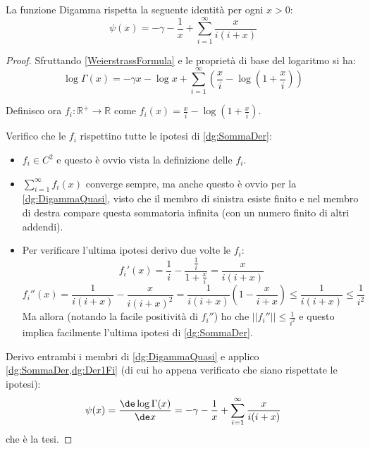 \begin{theorem}\label{dg:DigammaId}
	La funzione Digamma rispetta la seguente identità per ogni $x>0$:
	\begin{equation*}
		\psi(x)=-\gamma-\frac 1x +\sum_{i=1}^{\infty} \frac x{i(i+x)}
	\end{equation*}
\end{theorem}
\begin{proof}
	Sfruttando \cref{WeierstrassFormula} e le proprietà di base del logaritmo si ha:
	\begin{equation}\label{dg:DigammaQuasi}
		\log\Gamma(x)=-\gamma x- \log{x} +\sum_{i=1}^{\infty}\left(\frac xi -\log\left(1+\frac xi\right)\right)
	\end{equation}
	
	Definisco ora $f_i:\mathbb{R^+}\to\mathbb{R}$ come $f_i(x)=\frac xi -\log\left(1+\frac xi\right)$.
	
	Verifico che le $f_i$ rispettino tutte le ipotesi di \cref{dg:SommaDer}:
	\begin{itemize}
		\item $f_i\in C^2$ e questo è ovvio vista la definizione delle $f_i$.
		\item $\sum_{i=1}^{\infty}f_i(x)$ converge sempre, ma anche questo è ovvio per la \cref{dg:DigammaQuasi}, visto che
		il membro di sinistra esiste finito e nel membro di destra compare questa sommatoria infinita (con un numero finito
		di altri addendi).
		\item Per verificare l'ultima ipotesi derivo due volte le $f_i$:
		\begin{equation}\label{dg:Der1Fi}
			f_i'(x)=\frac 1i -\frac{\frac 1i}{1+\frac xi}=\frac{x}{i(i+x)}
		\end{equation}
		\begin{equation*}
			f_i''(x)=\frac 1{i(i+x)} - \frac{x}{i(i+x)^2}=\frac 1{i(i+x)}\left(1-\frac x{i+x}\right)\le \frac 1{i(i+x)}\le \frac 1{i^2}
		\end{equation*}
		Ma allora (notando la facile positività di $f_i''$) ho che $||f_i''||\le \frac 1{i^2}$ e questo implica facilmente 
		l'ultima ipotesi di \cref{dg:SommaDer}.
	\end{itemize}
	
	Derivo entrambi i membri di \cref{dg:DigammaQuasi} e applico \cref{dg:SommaDer,dg:Der1Fi} (di cui ho appena verificato che siano rispettate
	le ipotesi):
	\begin{equation*}
		\psi(x)=\frac{\de \log\Gamma(x)}{\de x}=-\gamma-\frac 1x + \sum_{i=1}^{\infty}\frac{x}{i(i+x)}
	\end{equation*}
	che è la tesi.
\end{proof}

